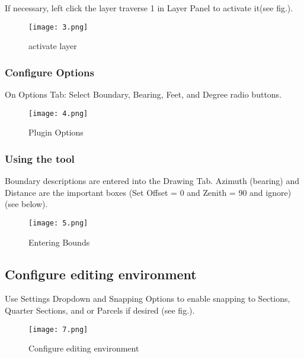 \documentclass{report}
\begin{document}
If necessary, left click the layer traverse 1 in Layer Panel to activate it(see fig.).
\begin{figure}[H] %
\begin{center}
	\texttt{[image: 3.png]} 
	\end{center}
	\caption{activate layer}
\end{figure}

\subsubsection{Configure Options}
\large On Options Tab: Select Boundary, Bearing, Feet, and Degree radio buttons.
\begin{figure}[H]
\begin{center}
	\texttt{[image: 4.png]} 
	\end{center}
	\caption{Plugin Options}
\end{figure}
\pagebreak

\subsubsection{Using the tool}
\large Boundary descriptions are entered into the Drawing Tab. Azimuth (bearing) and Distance are the important boxes (Set Offset = 0 and Zenith = 90 and ignore)(see below).
\begin{figure}[H]
\begin{center}
	\texttt{[image: 5.png]} 
	\end{center}
	\caption{Entering Bounds}
\end{figure}
\pagebreak

\subsection{Configure editing environment}
\large Use Settings Dropdown and Snapping Options to enable snapping to Sections, Quarter Sections, and or Parcels if desired (see fig.).

\begin{figure}[H]
\begin{center}
	\texttt{[image: 7.png]} 
	\end{center}
	\caption{Configure editing environment}
\end{figure}
\pagebreak

\end{document}
